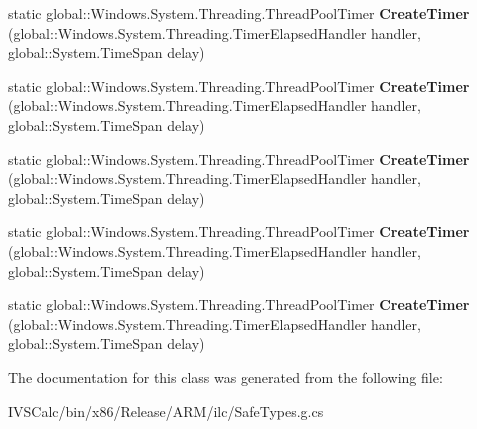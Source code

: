 \begin{DoxyCompactItemize}
\item 
\mbox{\label{class_windows_1_1_system_1_1_threading_1_1_thread_pool_timer_a3dd88ee21ddc606126ff808dbf10368c}} 
static global\+::\+Windows.\+System.\+Threading.\+Thread\+Pool\+Timer {\bfseries Create\+Timer} (global\+::\+Windows.\+System.\+Threading.\+Timer\+Elapsed\+Handler handler, global\+::\+System.\+Time\+Span delay)
\item 
\mbox{\label{class_windows_1_1_system_1_1_threading_1_1_thread_pool_timer_a3dd88ee21ddc606126ff808dbf10368c}} 
static global\+::\+Windows.\+System.\+Threading.\+Thread\+Pool\+Timer {\bfseries Create\+Timer} (global\+::\+Windows.\+System.\+Threading.\+Timer\+Elapsed\+Handler handler, global\+::\+System.\+Time\+Span delay)
\item 
\mbox{\label{class_windows_1_1_system_1_1_threading_1_1_thread_pool_timer_a3dd88ee21ddc606126ff808dbf10368c}} 
static global\+::\+Windows.\+System.\+Threading.\+Thread\+Pool\+Timer {\bfseries Create\+Timer} (global\+::\+Windows.\+System.\+Threading.\+Timer\+Elapsed\+Handler handler, global\+::\+System.\+Time\+Span delay)
\item 
\mbox{\label{class_windows_1_1_system_1_1_threading_1_1_thread_pool_timer_a3dd88ee21ddc606126ff808dbf10368c}} 
static global\+::\+Windows.\+System.\+Threading.\+Thread\+Pool\+Timer {\bfseries Create\+Timer} (global\+::\+Windows.\+System.\+Threading.\+Timer\+Elapsed\+Handler handler, global\+::\+System.\+Time\+Span delay)
\item 
\mbox{\label{class_windows_1_1_system_1_1_threading_1_1_thread_pool_timer_a3dd88ee21ddc606126ff808dbf10368c}} 
static global\+::\+Windows.\+System.\+Threading.\+Thread\+Pool\+Timer {\bfseries Create\+Timer} (global\+::\+Windows.\+System.\+Threading.\+Timer\+Elapsed\+Handler handler, global\+::\+System.\+Time\+Span delay)
\end{DoxyCompactItemize}


The documentation for this class was generated from the following file\+:\begin{DoxyCompactItemize}
\item 
I\+V\+S\+Calc/bin/x86/\+Release/\+A\+R\+M/ilc/Safe\+Types.\+g.\+cs\end{DoxyCompactItemize}
